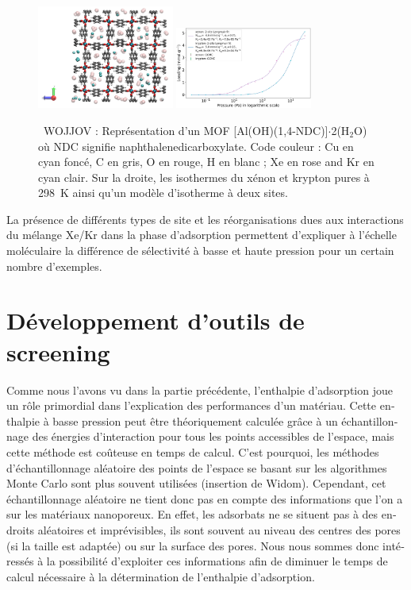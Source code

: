 \documentclass[thesis]{subfiles}
\begin{document}
\begin{otherlanguage}{french}
\begin{figure}[h]
\centering
  \includegraphics[width=0.4\textwidth]{figures/2-thermo/WOJJOV_clean.jpg}
  \includegraphics[width=0.4\textwidth]{figures/2-thermo/WOJJOV_clean_isotherm_xenon_krypton_298K.jpg}
  \caption{\small{\ WOJJOV : Représentation d'un MOF [Al(OH)(1,4-NDC)]$\cdot$2(H$_2$O) où NDC signifie naphthalenedicarboxylate. Code couleur : Cu en cyan foncé, C en gris, O en rouge, H en blanc ; Xe en rose and Kr en cyan clair. Sur la droite, les isothermes du xénon et krypton pures à \SI{298}{\kelvin} ainsi qu'un modèle d'isotherme à deux sites.}}
  \label{WOJJOV_resume}
\end{figure}

La présence de différents types de site et les réorganisations dues aux interactions du mélange Xe/Kr dans la phase d'adsorption permettent d'expliquer à l'échelle moléculaire la différence de sélectivité à basse et haute pression pour un certain nombre d'exemples.

\section*{Développement d'outils de screening}

Comme nous l'avons vu dans la partie précédente, l'enthalpie d'adsorption joue un rôle primordial dans l'explication des performances d'un matériau. Cette enthalpie à basse pression peut être théoriquement calculée grâce à un échantillonnage des énergies d'interaction pour tous les points accessibles de l'espace, mais cette méthode est coûteuse en temps de calcul. C'est pourquoi, les méthodes d'échantillonnage aléatoire des points de l'espace se basant sur les algorithmes Monte Carlo sont plus souvent utilisées (insertion de Widom). Cependant, cet échantillonnage aléatoire ne tient donc pas en compte des informations que l'on a sur les matériaux nanoporeux. En effet, les adsorbats ne se situent pas à des endroits aléatoires et imprévisibles, ils sont souvent au niveau des centres des pores (si la taille est adaptée) ou sur la surface des pores. Nous nous sommes donc intéressés à la possibilité d'exploiter ces informations afin de diminuer le temps de calcul nécessaire à la détermination de l'enthalpie d'adsorption.


\end{otherlanguage}
\end{document}

